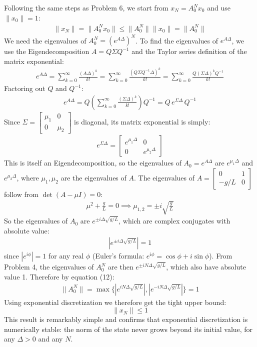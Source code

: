 \documentclass[12pt,twoside]{article}
\begin{document}
Following the same steps as Problem 6, we start from $x_N = A_0^N x_0$ and use
$\|x_0\| = 1$:
\begin{align}
    \|x_N\| = \|A_0^N x_0\| \leq \|A_0^N\| \|x_0\| = \|A_0^N\|
\end{align}
We need the eigenvalues of $A_0^N = (e^{A\Delta})^N$. To find the eigenvalues of
$e^{A\Delta}$, we use the Eigendecomposition $A = Q\Sigma Q^{-1}$ and the Taylor
series definition of the matrix exponential:
\begin{align}
    e^{A\Delta} = \sum_{k=0}^{\infty} \frac{(A\Delta)^k}{k!} = \sum_{k=0}^{\infty} \frac{(Q\Sigma Q^{-1}\Delta)^k}{k!} = \sum_{k=0}^{\infty} \frac{Q(\Sigma\Delta)^k Q^{-1}}{k!}
\end{align}
Factoring out $Q$ and $Q^{-1}$:
\begin{align}
    e^{A\Delta} = Q\left(\sum_{k=0}^{\infty} \frac{(\Sigma\Delta)^k}{k!}\right)Q^{-1} = Q\, e^{\Sigma\Delta}\, Q^{-1}
\end{align}
Since $\Sigma = \begin{bmatrix} \mu_1 & 0 \\ 0 & \mu_2 \end{bmatrix}$ is diagonal, its
matrix exponential is simply:
\begin{align}
    e^{\Sigma\Delta} = \begin{bmatrix} e^{\mu_1\Delta} & 0 \\ 0 & e^{\mu_2\Delta} \end{bmatrix}
\end{align}
This is itself an Eigendecomposition, so the eigenvalues of $A_0 = e^{A\Delta}$ are
$e^{\mu_1\Delta}$ and $e^{\mu_2\Delta}$, where $\mu_1, \mu_2$ are the eigenvalues of
$A$. The eigenvalues of $A = \begin{bmatrix} 0 & 1 \\ -g/L & 0 \end{bmatrix}$ follow
from $\det(A - \mu I) = 0$:
\begin{align}
    \mu^2 + \frac{g}{L} = 0 \implies \mu_{1,2} = \pm i\sqrt{\frac{g}{L}}
\end{align}
So the eigenvalues of $A_0$ are $e^{\pm i\Delta\sqrt{g/L}}$, which are complex
conjugates with absolute value:
\begin{align}
    |e^{\pm i\Delta\sqrt{g/L}}| = 1
\end{align}
since $|e^{i\phi}| = 1$ for any real $\phi$ (Euler's formula: $e^{i\phi} = \cos\phi +
i\sin\phi$). From Problem 4, the eigenvalues of $A_0^N$ are then $e^{\pm
iN\Delta\sqrt{g/L}}$, which also have absolute value 1. Therefore by equation (12):
\begin{align}
    \|A_0^N\| = \max\{|e^{iN\Delta\sqrt{g/L}}|, |e^{-iN\Delta\sqrt{g/L}}|\} = 1
\end{align}
Using exponential discretization we therefore get the tight upper bound:
$$
    \|x_N\| \leq 1
$$
This result is remarkably simple and confirms that exponential discretization is
numerically stable: the norm of the state never grows beyond its initial
value, for any $\Delta > 0$ and any $N$.
\end{document}
